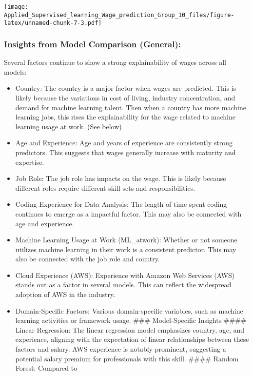 \documentclass[
]{article}
\providecommand{\tightlist}{%
  \setlength{\itemsep}{0pt}\setlength{\parskip}{0pt}}
\begin{document}
\texttt{[image: Applied\_Supervised\_learning\_Wage\_prediction\_Group\_10\_files/figure-latex/unnamed-chunk-7-3.pdf]}

\subsubsection{Insights from Model Comparison
(General):}\label{insights-from-model-comparison-general}

Several factors continue to show a strong explainability of wages across
all models:

\begin{itemize}
\tightlist
\item
  Country: The country is a major factor when wages are predicted. This
  is likely because the variations in cost of living, industry
  concentration, and demand for machine learning talent. Then when a
  country has more machine learning jobs, this rises the explainability
  for the wage related to machine learning usage at work. (See below)
\item
  Age and Experience: Age and years of experience are consistently
  strong predictors. This suggests that wages generally increase with
  maturity and expertise.
\item
  Job Role: The job role has impacts on the wage. This is likely because
  different roles require different skill sets and responsibilities.
\item
  Coding Experience for Data Analysis: The length of time spent coding
  continues to emerge as a impactful factor. This may also be connected
  with age and experience.
\item
  Machine Learning Usage at Work (ML\_atwork): Whether or not someone
  utilizes machine learning in their work is a consistent predictor.
  This may also be connected with the job role and country.
\item
  Cloud Experience (AWS): Experience with Amazon Web Services (AWS)
  stands out as a factor in several models. This can reflect the
  widespread adoption of AWS in the industry.
\item
  Domain-Specific Factors: Various domain-specific variables, such as
  machine learning activities or framework usage. \#\#\# Model-Specific
  Insights \#\#\#\# Linear Regression: The linear regression model
  emphasizes country, age, and experience, aligning with the expectation
  of linear relationships between these factors and salary. AWS
  experience is notably prominent, suggesting a potential salary premium
  for professionals with this skill. \#\#\#\# Random Forest: Compared to

\end{itemize}
\end{document}
